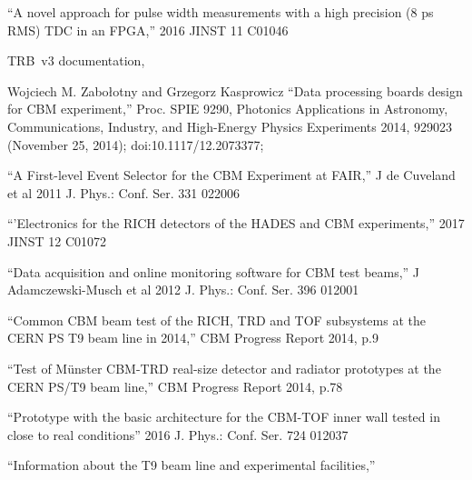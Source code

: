 \begin{thebibliography}{99}
``A novel approach for pulse width measurements with a high precision (8 ps RMS) TDC in an FPGA,''
2016 JINST 11 C01046



TRB~v3 documentation,

Wojciech M. Zabołotny and Grzegorz Kasprowicz
``Data processing boards design for CBM experiment,''
Proc. SPIE 9290, Photonics Applications in Astronomy, Communications, Industry, and High-Energy Physics Experiments 2014, 929023 (November 25, 2014); doi:10.1117/12.2073377;

``A First-level Event Selector for the CBM Experiment at FAIR,''
J de Cuveland et al 2011 J. Phys.: Conf. Ser. 331 022006

``'Electronics for the RICH detectors of the HADES and CBM experiments,''
2017 JINST 12 C01072

``Data acquisition and online monitoring software for CBM test beams,''
J Adamczewski-Musch et al 2012 J. Phys.: Conf. Ser. 396 012001


``Common CBM beam test of the RICH, TRD and TOF subsystems at the CERN PS T9 beam line in 2014,''
CBM Progress Report 2014, p.9

``Test of M\"unster CBM-TRD real-size detector and radiator prototypes at the CERN PS/T9 beam line,''
CBM Progress Report 2014, p.78

``Prototype with the basic architecture for the CBM-TOF inner wall tested in close to real conditions''
2016 J. Phys.: Conf. Ser. 724 012037

``Information about the T9 beam line and experimental facilities,''


\end{thebibliography}
